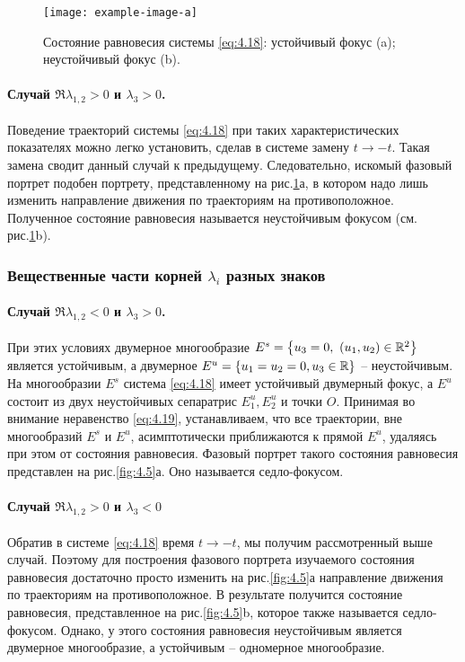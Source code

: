 \begin{figure}[h!]
        \centering
        \texttt{[image: example-image-a]}
        \caption{Состояние равновесия системы \eqref{eq:4.18}: устойчивый фокус (a); 
        неустойчивый фокус (b).}
        \label{fig:4.4}
\end{figure}

\paragraph{Случай $\Re \lambda_{1,2}>0$ и $\lambda_3>0$.}%
\label{par:sluchai_re_1,2_0_i_lambda_3_0_}

Поведение траекторий системы \eqref{eq:4.18} при таких характеристических показателях можно легко установить, сделав в системе замену $t \to - t$. Такая замена сводит данный случай к предыдущему.
Следовательно, искомый фазовый портрет подобен портрету, представленному на рис.\ref{fig:4.4}а, в котором надо лишь изменить направление движения по траекториям на противоположное. Полученное состояние равновесия называется неустойчивым фокусом (см. рис.\ref{fig:4.4}b).

\subsubsection{Вещественные части корней $\lambda_i$ разных знаков}%
\label{ssub:veshchestvennye_chasti_kornei_lambda_i_raznykh_znakov}

\paragraph{Случай $\Re \lambda_{1,2}<0$ и $\lambda_3>0$.}%
\label{par:sluchai_re_1,2_0_i_lambda_3_0_}

При этих условиях двумерное многообразие $E^{s} = \qty{ u_3 =0, ~ (u_1, u_2) \in \mathbb{R}^2}$ является устойчивым, а двумерное $E^{u} = \qty{u_1 = u_2=0, u_3 \in \mathbb{R}}$ -- неустойчивым.
На многообразии $E^{s}$ система \eqref{eq:4.18} имеет устойчивый двумерный фокус, а $E^{u}$ состоит из двух неустойчивых сепаратрис $E_1^{u}, E_2^{u}$ и точки $O$. Принимая во внимание неравенство \eqref{eq:4.19}, устанавливаем, что все траектории, вне многообразий $E^{s}$ и $E^{u}$,
асимптотически приближаются к прямой $E^{u}$, удаляясь при этом от состояния равновесия. Фазовый портрет такого состояния равновесия представлен на рис.\ref{fig:4.5}а. Оно называется седло-фокусом.

\paragraph{Случай $\Re \lambda_{1,2}>0$ и $\lambda_3<0$}%
\label{par:sluchai_re_1,2_0_i_lambda_3_0_}
Обратив в системе \eqref{eq:4.18} время $t \to - t$, мы получим рассмотренный выше случай. Поэтому для построения фазового портрета изучаемого состояния равновесия достаточно просто изменить на рис.\ref{fig:4.5}а направление движения по траекториям на противоположное. В результате получится состояние равновесия, представленное на рис.\ref{fig:4.5}b, которое также называется седло-фокусом. Однако, у этого состояния равновесия неустойчивым является двумерное многообразие, а устойчивым -- одномерное многообразие.

